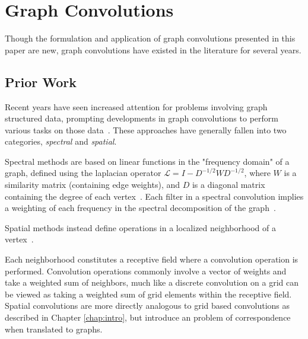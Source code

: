 \section{Graph Convolutions}
Though the formulation and application of graph convolutions presented in this paper are new, graph convolutions have existed in the literature for several years.


\subsection{Prior Work}
Recent years have seen increased attention for problems involving graph structured data, prompting developments in graph convolutions to perform various tasks on those data~\cite{bronstein2016}.
These approaches have generally fallen into two categories, \textit{spectral} and \textit{spatial}.

Spectral methods are based on linear functions in the "frequency domain" of a graph, defined using the laplacian operator $\mathcal{L}=I-D^{-1/2}WD^{-1/2}$, where $W$ is a similarity matrix (containing edge weights), and $D$ is a diagonal matrix containing the degree of each vertex~\cite{bruna2013}\cite{henaff2015}\cite{kipf2016}.
Each filter in a spectral convolution implies a weighting of each frequency in the spectral decomposition of the graph~\cite{mallat2009}.

Spatial methods instead define operations in a localized neighborhood of a vertex~\cite{henaff2015}\cite{atwood2016diffusion}.

Each neighborhood constitutes a receptive field where a convolution operation is performed. 
Convolution operations commonly involve a vector of weights and take a weighted sum of neighbors, much like a discrete convolution on a grid can be viewed as taking a weighted sum of grid elements within the receptive field.
Spatial convolutions are more directly analogous to grid based convolutions as described in Chapter \ref{chap:intro}, but introduce an problem of correspondence when translated to graphs.

